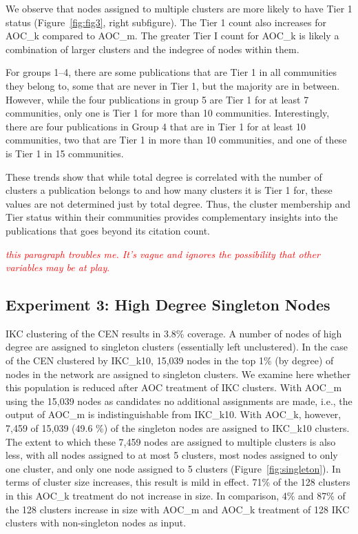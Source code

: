 \documentclass[12pt, oneside]{article}   	%
\begin{document}
We observe that nodes assigned to multiple clusters are more likely to have Tier 1 status (Figure~\ref{fig:fig3}, right subfigure). The Tier 1 count also increases for AOC\_k compared to AOC\_m. The greater Tier I count for AOC\_k is likely a combination of larger clusters and the indegree of nodes within them.

For groups 1--4, there are some publications that are Tier 1 in all communities they belong to, some that are never in Tier 1, but the majority are in between. 
However, while the four publications in group 5 are Tier 1 for at least 7 communities, only one is Tier 1 for more than 10 communities. 
Interestingly, there are four publications in Group 4 that are in Tier 1 for at least 10 communities, two that are Tier 1 in more than 10 communities, and one of these is Tier 1 in 15 communities.
	
These trends show that while total degree is correlated with the number of clusters a publication belongs to and how many clusters it is Tier 1 for,
these values are not determined just by total degree. Thus, the cluster membership and Tier status within their communities provides complementary insights into  the publications that goes beyond its citation count.
	
	\textcolor{red}{ 
		\emph{this paragraph troubles me. It's vague and  ignores the possibility that other variables may be at play}. }
	
	\subsection{Experiment 3: High Degree Singleton Nodes} 
	
	IKC clustering of the CEN results in 3.8\% coverage. A number of nodes of high degree are assigned to singleton clusters (essentially left unclustered). In the case of the CEN clustered by IKC\_k10, 15,039 nodes in the top 1\% (by degree) of nodes in the network are assigned to singleton clusters. We examine here whether this population is reduced after AOC treatment of IKC clusters. With AOC\_m using the 15,039 nodes as candidates no additional assignments are made, i.e., the output of AOC\_m is indistinguishable from IKC\_k10. With AOC\_k, however, 7,459 of 15,039 (49.6 \%) of the singleton nodes are assigned to IKC\_k10 clusters. The extent to which these 7,459 nodes are assigned to multiple clusters is also less, with all nodes assigned to at most 5 clusters, most nodes assigned to only one cluster, and only one node assigned to 5 clusters (Figure~\ref{fig:singleton}). In terms of cluster size increases, this result is mild in effect. 71\% of the 128 clusters in this AOC\_k treatment do not increase in size. In comparison, 4\% and 87\% of the 128 clusters increase in size with AOC\_m and AOC\_k treatment of 128 IKC clusters with non-singleton nodes as input.  
	
\end{document}
